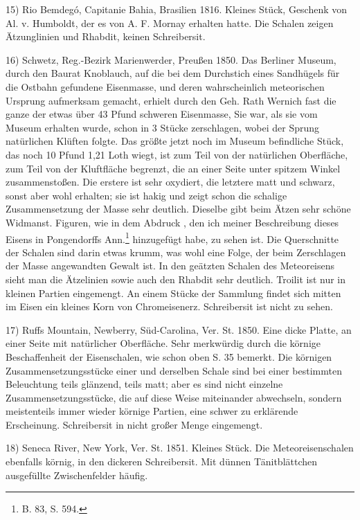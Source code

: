 \documentclass[a4paper, 11pt, oneside]{article}
\begin{document}
15) Rio Bemdegó, Capitanie Bahia, Brasilien 1816. Kleines Stück, Geschenk von Al. v. Humboldt, der es von A. F. Mornay erhalten hatte. Die Schalen zeigen Ätzunglinien und Rhabdit, keinen Schreibersit.

16) Schwetz, Reg.-Bezirk Marienwerder, Preußen 1850. Das Berliner Museum, durch den Baurat Knoblauch, auf die bei dem Durchstich eines Sandhügels für die Ostbahn gefundene Eisenmasse, und deren wahrscheinlich meteorischen Ursprung aufmerksam gemacht, erhielt durch den Geh. Rath Wernich fast die ganze der etwas über 43 Pfund schweren Eisenmasse, Sie war, als sie vom Museum erhalten wurde, schon in 3 Stücke zerschlagen, wobei der Sprung natürlichen Klüften folgte. Das größte jetzt noch im Museum befindliche Stück, das noch 10 Pfund 1,21 Loth wiegt, ist zum Teil von der natürlichen Oberfläche, zum Teil von der Kluftfläche begrenzt, die an einer Seite unter spitzem Winkel zusammenstoßen. Die erstere ist sehr oxydiert, die letztere matt und schwarz, sonst aber wohl erhalten; sie ist hakig und zeigt schon die schalige Zusammensetzung der Masse sehr deutlich. Dieselbe gibt beim Ätzen sehr schöne Widmanst. Figuren, wie in dem Abdruck , den ich meiner Beschreibung dieses Eisens in Pongendorffs Ann.\footnote{B. 83, S. 594.} hinzugefügt habe, zu sehen ist. Die Querschnitte der Schalen sind darin etwas krumm, was wohl eine Folge, der beim Zerschlagen der Masse angewandten Gewalt ist. In den geätzten Schalen des Meteoreisens sieht man die Ätzelinien sowie auch den Rhabdit sehr deutlich. Troilit ist nur in kleinen Partien eingemengt. An einem Stücke der Sammlung findet sich mitten im Eisen ein kleines Korn von Chromeisenerz. Schreibersit ist nicht zu sehen.

17) Ruffs Mountain, Newberry, Süd-Carolina, Ver. St. 1850. Eine dicke Platte, an einer Seite mit natürlicher Oberfläche. Sehr merkwürdig durch die körnige Beschaffenheit der Eisenschalen, wie schon oben S. 35 bemerkt. Die körnigen Zusammensetzungsstücke einer und derselben Schale sind bei einer bestimmten Beleuchtung teils glänzend, teils matt; aber es sind nicht einzelne Zusammensetzungsstücke, die auf diese Weise miteinander abwechseln, sondern meistenteils immer wieder körnige Partien, eine schwer zu erklärende Erscheinung. Schreibersit in nicht großer Menge eingemengt.

18) Seneca River, New York, Ver. St. 1851. Kleines Stück. Die Meteoreisenschalen ebenfalls körnig, in den dickeren Schreibersit. Mit dünnen Tänitblättchen ausgefüllte Zwischenfelder häufig.
\end{document}
